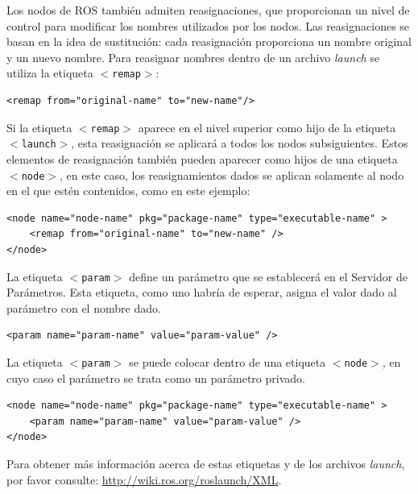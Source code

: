 \documentclass[12pt,twoside,final]{book}
\begin{document}
Los nodos de ROS también admiten reasignaciones, que proporcionan un nivel de control para modificar los nombres utilizados por los nodos. Las reasignaciones se basan en la idea de sustitución: cada reasignación proporciona un nombre original y un nuevo nombre. Para reasignar nombres dentro de un archivo \textit{launch} se utiliza la etiqueta \texttt{$ < $remap$ > $}:

\begin{verbatim}
<remap from="original-name" to="new-name"/>
\end{verbatim}

Si la etiqueta \texttt{$ < $remap$ > $} aparece en el nivel superior como hijo de la etiqueta \texttt{$ < $launch$ > $}, esta reasignación se aplicará a todos los nodos subsiguientes. Estos elementos de reasignación también pueden aparecer como hijos de una etiqueta \texttt{$ < $node$ > $}, en este caso, los reasignamientos dados se aplican solamente al nodo en el que estén contenidos, como en este ejemplo:

\begin{verbatim}
<node name="node-name" pkg="package-name" type="executable-name" >
	<remap from="original-name" to="new-name" />
</node>
\end{verbatim}

La etiqueta \texttt{$ < $param$ > $} define un parámetro que se establecerá en el Servidor de Parámetros. Esta etiqueta, como uno habría de esperar, asigna el valor dado al parámetro con el nombre dado.

\begin{verbatim}
<param name="param-name" value="param-value" />
\end{verbatim}

La etiqueta \texttt{$ < $param$ > $} se puede colocar dentro de una etiqueta \texttt{$ < $node$ > $}, en cuyo caso el parámetro se trata como un parámetro privado.

\begin{verbatim}
<node name="node-name" pkg="package-name" type="executable-name" >
	<param name="param-name" value="param-value" />
</node>
\end{verbatim}

Para obtener más información acerca de estas etiquetas y de los archivos \textit{launch}, por favor consulte: \url{http://wiki.ros.org/roslaunch/XML}. 
\end{document}
